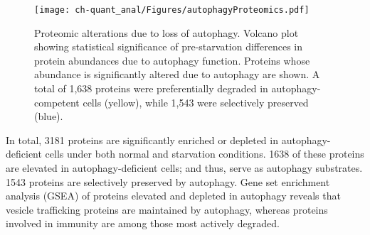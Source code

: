 \begin{figure}[h!]
\begin{center}
\texttt{[image: ch-quant\_anal/Figures/autophagyProteomics.pdf]}
\caption[Proteomic alterations due to loss of autophagy]{Proteomic alterations due to loss of autophagy. Volcano plot showing statistical significance of pre-starvation differences in protein abundances due to autophagy function. Proteins whose abundance is significantly altered due to autophagy are shown. A total of 1,638 proteins were preferentially degraded in autophagy-competent cells (yellow), while 1,543 were selectively preserved (blue).}
\label{ch-quant_anal:autophagyProteomics}
\end{center}
\end{figure}

In total, 3181 proteins are significantly enriched or depleted in autophagy-deficient cells under both normal and starvation conditions. 1638 of these proteins are elevated in autophagy-deficient cells; and thus, serve as autophagy substrates. 1543 proteins are selectively preserved by autophagy.  Gene set enrichment analysis (GSEA) of proteins elevated and depleted in autophagy reveals that vesicle trafficking proteins are maintained by autophagy, whereas proteins involved in immunity are among those most actively degraded.


